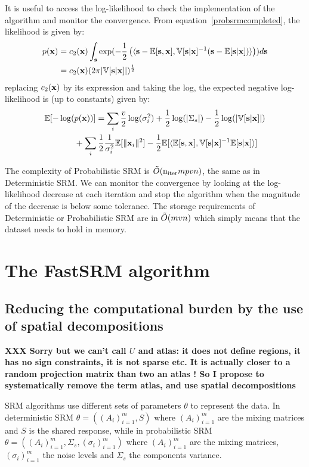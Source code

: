 \documentclass{article}
\begin{document}
It is useful to access the log-likelihood to check the implementation of the
algorithm and monitor the convergence.
%
From equation~\eqref{probsrmcompleted},
the likelihood is given by:
\begin{align}
  p(\mathbf{x}) &= c_2(\mathbf{x}) \int_{\mathbf{s}} \exp(-\frac12 \left( \langle{  \mathbf{s}- \mathbb{E}[\mathbf{s}},{ \mathbf{x}], \mathbb{V}[\mathbf{s} | \mathbf{x}]^{-1} ( \mathbf{s} - \mathbb{E}[\mathbf{s} | \mathbf{x}])  }\rangle \right)) d\mathbf{s} \\
         &= c_2(\mathbf{x}) (2 \pi |\mathbb{V}[\mathbf{s} | \mathbf{x}]|)^{\frac12}
\end{align}
replacing $c_2(\mathbf{x})$ by its expression and taking the log, the expected negative
log-likelihood is (up to constants) given by:
\begin{align}
  \mathbb{E}[-\log(&p(\mathbf{x}))] = \sum_i \frac{v}{2} \log(\sigma_i^2) + \frac12 \log(|\Sigma_s|) - \frac12 \log(|\mathbb{V}[\mathbf{s} | \mathbf{x}]|) \nonumber \\ &+ \sum_i
  \frac12 \frac1{\sigma_i^2} \mathbb{E}[\|\mathbf{x}_i\|^2] - \frac12 \mathbb{E}[\langle{  \mathbb{E}[\mathbf{s}},{ \mathbf{x}], \mathbb{V}[\mathbf{s} | \mathbf{x}]^{-1} \mathbb{E}[\mathbf{s} | \mathbf{x}] }\rangle]
\end{align}

The complexity of Probabilistic SRM is $\tilde{O}(\mathrm{n_{iter}} mpvn)$, the same as in
Deterministic SRM.
%
We can monitor the convergence by looking at the log-likelihood decrease at each iteration
and stop the algorithm when the magnitude of the decrease is below some
tolerance.
%
The storage requirements of Deterministic or Probabilistic SRM are in
$\tilde{O}(mvn)$ which simply means that the dataset needs to hold in memory.
%


\section{The FastSRM algorithm}

\subsection{Reducing the computational burden by the use of spatial decompositions}

\textbf{XXX Sorry but we can't call $U$ and atlas: it does not define regions, it has no sign constraints, it is not sparse etc. It is actually closer to a random projection matrix than two an atlas ! So I propose to systematically remove the term atlas, and use spatial decompositions}

SRM algorithms use different sets of parameters $\theta$ to represent the data.
%
In deterministic SRM $\theta = \left((A_i)_{i=1}^m, S \right)$ where $(A_i)_{i=1}^m$ are the
mixing matrices and $S$ is the shared response, while in probabilistic SRM $\theta
= \left( (A_i)_{i=1}^m, \Sigma_s, (\sigma_i)_{i=1}^m \right) $ where $(A_i)_{i=1}^m$ are the
mixing matrices, $(\sigma_i)_{i=1}^m$ the noise levels and $\Sigma_s$ the
components variance.
%
\end{document}
